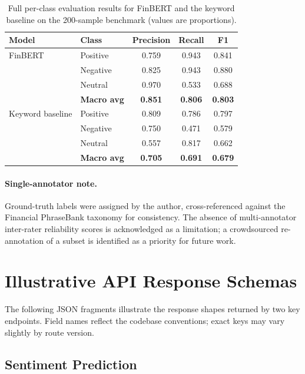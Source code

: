 \begin{table}[!ht]
\centering
\small
\caption{Full per-class evaluation results for FinBERT and the keyword baseline on the 200-sample benchmark (values are proportions).}
\label{tab:full_results_appendix}
\begin{tabular}{@{}llccc@{}}
\toprule
\textbf{Model} & \textbf{Class} & \textbf{Precision} & \textbf{Recall} & \textbf{F1} \\
\midrule
FinBERT & Positive  & 0.759 & 0.943 & 0.841 \\
        & Negative  & 0.825 & 0.943 & 0.880 \\
        & Neutral   & 0.970 & 0.533 & 0.688 \\
        & \textbf{Macro avg} & \textbf{0.851} & \textbf{0.806} & \textbf{0.803} \\
\midrule
Keyword baseline & Positive  & 0.809 & 0.786 & 0.797 \\
                 & Negative  & 0.750 & 0.471 & 0.579 \\
                 & Neutral   & 0.557 & 0.817 & 0.662 \\
                 & \textbf{Macro avg} & \textbf{0.705} & \textbf{0.691} & \textbf{0.679} \\
\bottomrule
\end{tabular}
\end{table}

\paragraph{Single-annotator note.}
Ground-truth labels were assigned by the author, cross-referenced against the Financial PhraseBank taxonomy \citep{malo2014financialphrasebank} for consistency. The absence of multi-annotator inter-rater reliability scores is acknowledged as a limitation; a crowdsourced re-annotation of a subset is identified as a priority for future work.

\section{Illustrative API Response Schemas}
\label{app:api_samples}

The following JSON fragments illustrate the response shapes returned by two key endpoints. Field names reflect the codebase conventions; exact keys may vary slightly by route version.

\subsection*{Sentiment Prediction}

